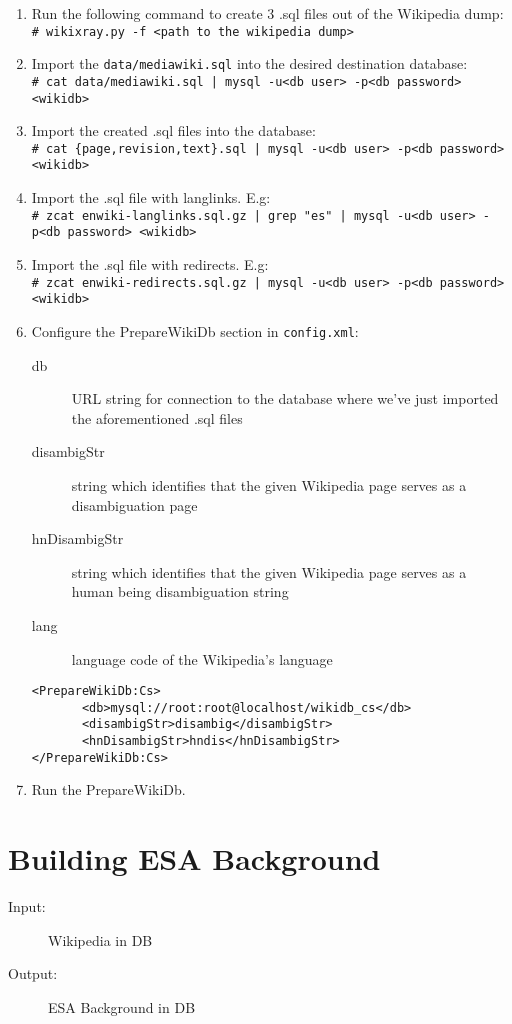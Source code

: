 \documentclass{article}
\begin{document}
\begin{enumerate}
\item Run the following command to create 3 .sql files out of the Wikipedia dump: \\ \texttt{\# wikixray.py -f <path to the wikipedia dump>}
\item Import the \texttt{data/mediawiki.sql} into the desired destination database: \\
\texttt{\# cat data/mediawiki.sql | mysql -u<db user> -p<db password> <wikidb>}
\item Import the created .sql files into the database: \\
\texttt{\# cat \{page,revision,text\}.sql | mysql -u<db user> -p<db password> <wikidb>}
\item Import the .sql file with langlinks. E.g: \\
\texttt{\# zcat enwiki-langlinks.sql.gz | grep "es" | mysql -u<db user> -p<db password> <wikidb>}
\item Import the .sql file with redirects. E.g: \\
\texttt{\# zcat enwiki-redirects.sql.gz | mysql -u<db user> -p<db password> <wikidb>}
\item Configure the PrepareWikiDb section in \verb|config.xml|:
  \begin{description}
  \item[db] URL string for connection to the database where we've just imported the aforementioned .sql files
  \item[disambigStr] string which identifies that the given Wikipedia page serves as a disambiguation page
  \item[hnDisambigStr] string which identifies that the given Wikipedia page serves as a human being disambiguation string
  \item[lang] language code of the Wikipedia's language
  \end{description}
\begin{verbatim}
<PrepareWikiDb:Cs>
       <db>mysql://root:root@localhost/wikidb_cs</db>
       <disambigStr>disambig</disambigStr>
       <hnDisambigStr>hndis</hnDisambigStr>
</PrepareWikiDb:Cs>
\end{verbatim}
\item Run the PrepareWikiDb.
\end{enumerate}


\section*{Building ESA Background}
\begin{description}
  \item[Input:] Wikipedia in DB
  \item[Output:] ESA Background in DB
\end{description}
\end{document}

